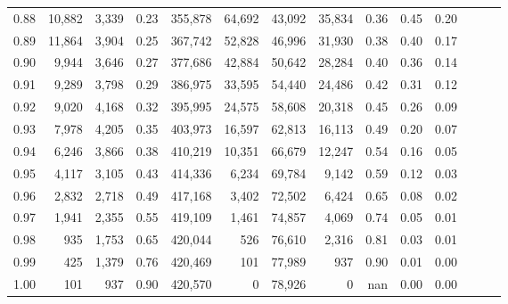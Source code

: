 \begin{tabular}{rrrrrrrrrrrrrr}
0.88 &  10,882 &  3,339 &  0.23 &  355,878 &   64,692 &  43,092 &  35,834 &  0.36 &  0.45 &      0.20 \\
0.89 &  11,864 &  3,904 &  0.25 &  367,742 &   52,828 &  46,996 &  31,930 &  0.38 &  0.40 &      0.17 \\
0.90 &   9,944 &  3,646 &  0.27 &  377,686 &   42,884 &  50,642 &  28,284 &  0.40 &  0.36 &      0.14 \\
0.91 &   9,289 &  3,798 &  0.29 &  386,975 &   33,595 &  54,440 &  24,486 &  0.42 &  0.31 &      0.12 \\
0.92 &   9,020 &  4,168 &  0.32 &  395,995 &   24,575 &  58,608 &  20,318 &  0.45 &  0.26 &      0.09 \\
0.93 &   7,978 &  4,205 &  0.35 &  403,973 &   16,597 &  62,813 &  16,113 &  0.49 &  0.20 &      0.07 \\
0.94 &   6,246 &  3,866 &  0.38 &  410,219 &   10,351 &  66,679 &  12,247 &  0.54 &  0.16 &      0.05 \\
0.95 &   4,117 &  3,105 &  0.43 &  414,336 &    6,234 &  69,784 &   9,142 &  0.59 &  0.12 &      0.03 \\
0.96 &   2,832 &  2,718 &  0.49 &  417,168 &    3,402 &  72,502 &   6,424 &  0.65 &  0.08 &      0.02 \\
0.97 &   1,941 &  2,355 &  0.55 &  419,109 &    1,461 &  74,857 &   4,069 &  0.74 &  0.05 &      0.01 \\
0.98 &     935 &  1,753 &  0.65 &  420,044 &      526 &  76,610 &   2,316 &  0.81 &  0.03 &      0.01 \\
0.99 &     425 &  1,379 &  0.76 &  420,469 &      101 &  77,989 &     937 &  0.90 &  0.01 &      0.00 \\
1.00 &     101 &    937 &  0.90 &  420,570 &        0 &  78,926 &       0 &   nan &  0.00 &      0.00 \\
\bottomrule
\end{tabular}
